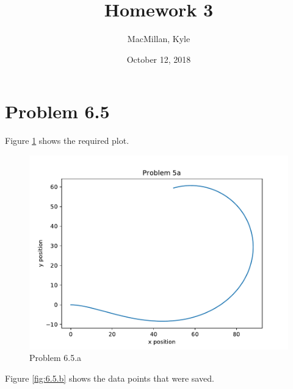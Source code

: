 \documentclass{article}
\title{\textbf{Homework 3}}
\author{MacMillan, Kyle}
\date{October 12, 2018}
\begin{document}
\maketitle

\newpage
\tableofcontents
{}




\newpage
\hypersetup{
    colorlinks,
    citecolor=blue,
    filecolor=black,
    linkcolor=blue,
    urlcolor=blue
}

\setcounter{page}{1}
\newpage
\section{\textbf{Problem 6.5}}
Figure \ref{fig:6.5.a} shows the required plot.

\begin{figure}[h]
    \centering
    \includegraphics[pages=1]{p6-5-a}
    \caption{Problem 6.5.a}
    \label{fig:6.5.a}
\end{figure}


\newpage
\noindent Figure \ref{fig:6.5.b} shows the data points that were saved.
\end{document}
